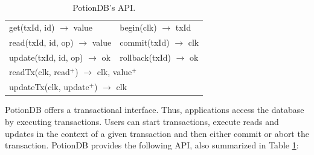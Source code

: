 \documentclass{vldb}
\newcommand{\code}[1]{\textsf{\small{#1}}}
\begin{document}
\begin{table}[t]
\center
	\begin{tabular}{ll} 
		\toprule
		\code{get(txId, id) $\rightarrow$ value}                  & \code{begin(clk) $\rightarrow$ txId}            \\
		\code{read(txId, id, op) $\rightarrow$ value}             & \code{commit(txId) $\rightarrow$ clk}          \\
		\code{update(txId, id, op) $\rightarrow$ ok}          & \code{rollback(txId) $\rightarrow$ ok}                        \\[4pt]
		\multicolumn{2}{l}{\code{readTx(clk, read$^+$) $\rightarrow$ clk, value$^+$}} \\
		\multicolumn{2}{l}{\code{updateTx(clk, update$^+$) $\rightarrow$ clk}} \\
		\bottomrule
	\end{tabular}
	\vspace{0.8em}
	\caption{PotionDB's API.}
	\label{table:PotionDB_API}
\end{table}

PotionDB offers a transactional interface.
Thus, applications access the database by executing transactions.
Users can start transactions, execute reads and updates in the context of a given transaction and then either commit or abort the transaction.
PotionDB provides the following API, also summarized in Table \ref{table:PotionDB_API}:
\end{document}
